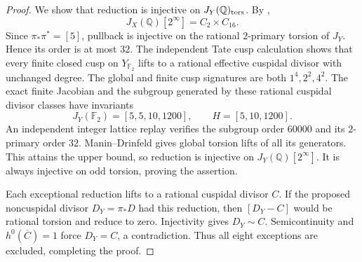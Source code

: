 \begin{proof}
We show that reduction is injective on $J_Y(\mathbb Q)_{\rm tors}$.
By \cite[Theorem~4.13 and Table~2]{DEHMZ},
\[
 J_X(\mathbb Q)[2^\infty]=C_2\times C_{16}.
\]
Since $\pi_*\pi^*=[5]$, pullback is injective on the rational
$2$-primary torsion of $J_Y$. Hence its order is at most $32$.
The independent Tate cusp calculation shows that every finite
closed cusp on $Y_{\mathbb F_2}$ lifts to a rational effective
cuspidal divisor with unchanged degree. The global and finite cusp
signatures are both $1^4,2^2,4^2$.
The exact finite Jacobian and the subgroup generated by these
rational cuspidal divisor classes have invariants
\[
 J_Y(\mathbb F_2)=[5,5,10,1200],\qquad H=[5,10,1200].
\]
An independent integer lattice replay verifies the subgroup order
$60000$ and its $2$-primary order $32$. Manin--Drinfeld gives global
torsion lifts of all its generators. This attains the upper bound,
so reduction is injective on $J_Y(\mathbb Q)[2^\infty]$.
It is always injective on odd torsion, proving the assertion.

Each exceptional reduction lifts to a rational cuspidal divisor $C$.
If the proposed noncuspidal divisor $D_Y=\pi_*D$ had this reduction,
then $[D_Y-C]$ would be rational torsion and reduce to zero.
Injectivity gives $D_Y\sim C$. Semicontinuity and
$h^0(\overline C)=1$ force $D_Y=C$, a contradiction.
Thus all eight exceptions are excluded, completing the proof.
\end{proof}
